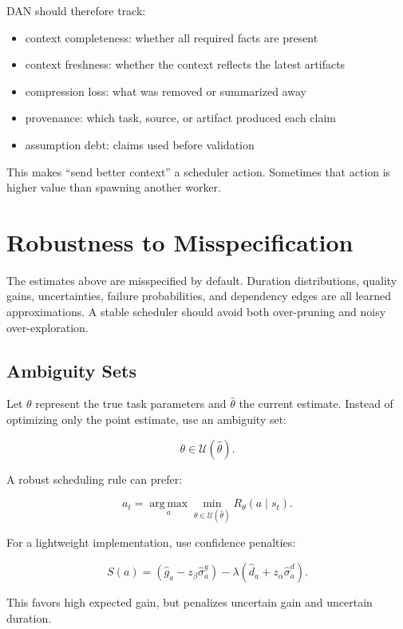 \documentclass[11pt]{article}
\newcommand{\argmax}{\operatorname*{arg\,max}}
\begin{document}
DAN should therefore track:

\begin{itemize}[leftmargin=1.5em]
\item context completeness: whether all required facts are present
\item context freshness: whether the context reflects the latest artifacts
\item compression loss: what was removed or summarized away
\item provenance: which task, source, or artifact produced each claim
\item assumption debt: claims used before validation
\end{itemize}

This makes ``send better context'' a scheduler action. Sometimes that action is higher value than spawning another worker.

\section{Robustness to Misspecification}

The estimates above are misspecified by default. Duration distributions, quality gains, uncertainties, failure probabilities, and dependency edges are all learned approximations. A stable scheduler should avoid both over-pruning and noisy over-exploration.

\subsection{Ambiguity Sets}

Let $\theta$ represent the true task parameters and $\widehat{\theta}$ the current estimate. Instead of optimizing only the point estimate, use an ambiguity set:

\[
\theta \in \mathcal{U}(\widehat{\theta}).
\]

A robust scheduling rule can prefer:

\[
a_t =
\argmax_a \min_{\theta \in \mathcal{U}(\widehat{\theta})}
R_\theta(a \mid s_t).
\]

For a lightweight implementation, use confidence penalties:

\[
S(a) =
\left(\widehat{g}_a - z_\beta \widehat{\sigma}^g_a \right)
- \lambda
\left(\widehat{d}_a + z_\alpha \widehat{\sigma}^d_a \right).
\]

This favors high expected gain, but penalizes uncertain gain and uncertain duration.
\end{document}
